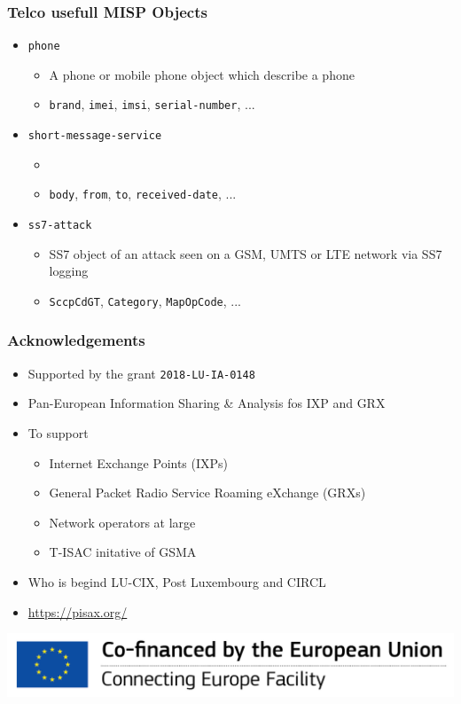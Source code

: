 \begin{frame}
    \frametitle{Telco usefull {\bf MISP Objects}}
    \begin{itemize}
        \item \texttt{phone}
        \begin{itemize}
            \item A phone or mobile phone object which describe a phone
            \item \texttt{brand}, \texttt{imei}, \texttt{imsi}, \texttt{serial-number}, ...
        \end{itemize}

        \item \texttt{short-message-service}
        \begin{itemize}
            \item 
            \item \texttt{body}, \texttt{from}, \texttt{to}, \texttt{received-date}, ...
        \end{itemize}

        \item \texttt{ss7-attack}
        \begin{itemize}
            \item SS7 object of an attack seen on a GSM, UMTS or LTE network via SS7 logging
            \item \texttt{SccpCdGT}, \texttt{Category}, \texttt{MapOpCode}, ...
        \end{itemize}
    \end{itemize}
\end{frame}

\begin{frame}
    \frametitle{Acknowledgements}
    \begin{itemize}
        \item Supported by the grant \texttt{2018-LU-IA-0148}
        \item Pan-European Information Sharing \& Analysis fos IXP and GRX
        \item To support
        \begin{itemize}
            \item Internet Exchange Points (IXPs)
            \item General Packet Radio Service Roaming eXchange (GRXs)
            \item Network operators at large
            \item T-ISAC initative of GSMA
        \end{itemize}
        \item Who is begind LU-CIX, Post Luxembourg and CIRCL
        \item \url{https://pisax.org/}
    \end{itemize}
    \begin{center}
        \includegraphics[scale=0.5]{en_cef.png}
    \end{center}
\end{frame}


